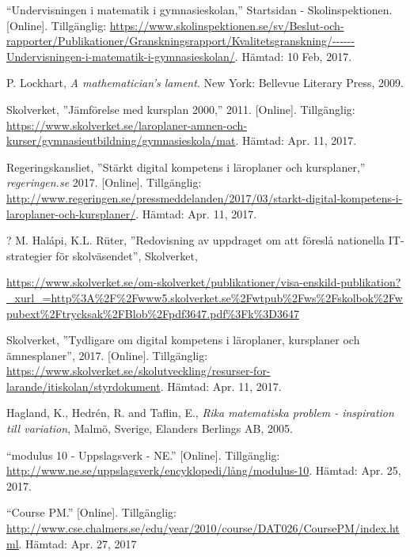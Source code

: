     “Undervisningen i matematik i gymnasieskolan,” Startsidan - Skolinspektionen. [Online]. Tillgänglig: \url{https://www.skolinspektionen.se/sv/Beslut-och-rapporter/Publikationer/Granskningsrapport/Kvalitetsgranskning/------Undervisningen-i-matematik-i-gymnasieskolan/}. Hämtad: 10 Feb, 2017.
    
    P. Lockhart, \textit{A mathematician's lament}. New York: Bellevue Literary Press, 2009.
    
    Skolverket, ''Jämförelse med kursplan 2000,'' 2011. [Online]. Tillgänglig: \url{https://www.skolverket.se/laroplaner-amnen-och-kurser/gymnasieutbildning/gymnasieskola/mat}. Hämtad: Apr. 11, 2017.
    
    Regeringskansliet, ''Stärkt digital kompetens i läroplaner och kursplaner,'' \textsl{regeringen.se} 2017. [Online]. Tillgänglig: \url{http://www.regeringen.se/pressmeddelanden/2017/03/starkt-digital-kompetens-i-laroplaner-och-kursplaner/}. Hämtad: Apr. 11, 2017.
    
    ?
    M. Halápi, K.L. Rüter, ''Redovisning av uppdraget om att föreslå nationella IT-strategier för skolväsendet'', Skolverket,
    
    \url{https://www.skolverket.se/om-skolverket/publikationer/visa-enskild-publikation?_xurl_=http\%3A\%2F\%2Fwww5.skolverket.se\%2Fwtpub\%2Fws\%2Fskolbok\%2Fwpubext\%2Ftrycksak\%2FBlob\%2Fpdf3647.pdf\%3Fk\%3D3647}
    
   Skolverket, ''Tydligare om digital kompetens i läroplaner, kursplaner och ämnesplaner'', 2017. [Online]. Tillgänglig: \url{https://www.skolverket.se/skolutveckling/resurser-for-larande/itiskolan/styrdokument}. Hämtad: Apr. 11, 2017.
   
    Hagland, K., Hedrén, R. and Taflin, E., \textit{Rika matematiska problem - inspiration till variation}, Malmö, Sverige, Elanders Berlings AB, 2005.
    
    “modulus 10 - Uppslagsverk - NE.” [Online]. Tillgänglig: \url{http://www.ne.se/uppslagsverk/encyklopedi/lång/modulus-10}. 
    Hämtad: Apr. 25, 2017.
    
    “Course PM.” [Online]. Tillgänglig: \url{http://www.cse.chalmers.se/edu/year/2010/course/DAT026/CoursePM/index.html}. 
    Hämtad: Apr. 27, 2017
    
